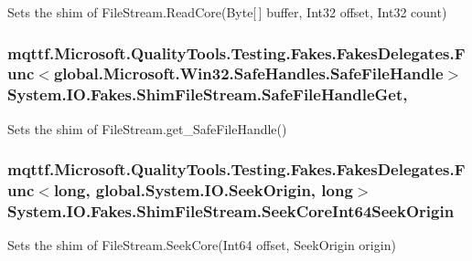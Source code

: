 Sets the shim of File\-Stream.\-Read\-Core(\-Byte\mbox{[}$\,$\mbox{]} buffer, Int32 offset, Int32 count)

\hypertarget{class_system_1_1_i_o_1_1_fakes_1_1_shim_file_stream_aaf854ff8a4f3e133fc50a6eb064569dc}{
\subsubsection[{Safe\-File\-Handle\-Get}]{\setlength{\rightskip}{0pt plus 5cm}mqttf.\-Microsoft.\-Quality\-Tools.\-Testing.\-Fakes.\-Fakes\-Delegates.\-Func$<$global.\-Microsoft.\-Win32.\-Safe\-Handles.\-Safe\-File\-Handle$>$ System.\-I\-O.\-Fakes.\-Shim\-File\-Stream.\-Safe\-File\-Handle\-Get\hspace{0.3cm}{\ttfamily [get]}, {\ttfamily [set]}}}\label{class_system_1_1_i_o_1_1_fakes_1_1_shim_file_stream_aaf854ff8a4f3e133fc50a6eb064569dc}


Sets the shim of File\-Stream.\-get\-\_\-\-Safe\-File\-Handle()

\hypertarget{class_system_1_1_i_o_1_1_fakes_1_1_shim_file_stream_a9ce54c4a516597227a09f057df6d4328}{
\subsubsection[{Seek\-Core\-Int64\-Seek\-Origin}]{\setlength{\rightskip}{0pt plus 5cm}mqttf.\-Microsoft.\-Quality\-Tools.\-Testing.\-Fakes.\-Fakes\-Delegates.\-Func$<$long, global.\-System.\-I\-O.\-Seek\-Origin, long$>$ System.\-I\-O.\-Fakes.\-Shim\-File\-Stream.\-Seek\-Core\-Int64\-Seek\-Origin\hspace{0.3cm}{\ttfamily [set]}}}\label{class_system_1_1_i_o_1_1_fakes_1_1_shim_file_stream_a9ce54c4a516597227a09f057df6d4328}


Sets the shim of File\-Stream.\-Seek\-Core(\-Int64 offset, Seek\-Origin origin)

